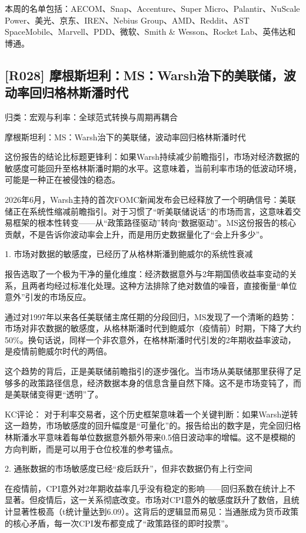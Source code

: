 \documentclass[11pt]{ctexart}
\begin{document}
本周的名单包括：AECOM、Snap、Accenture、Super Micro、Palantir、NuScale Power、美光、京东、IREN、Nebius Group、AMD、Reddit、AST SpaceMobile、Marvell、PDD、微软、Smith \& Wesson、Rocket Lab、英伟达和博通。

\subsection{[R028] 摩根斯坦利：MS：Warsh治下的美联储，波动率回归格林斯潘时代}
{\small\color{refgray}归类：宏观与利率：全球范式转换与周期再耦合}

摩根斯坦利：MS：Warsh治下的美联储，波动率回归格林斯潘时代

这份报告的结论比标题更锋利：如果Warsh持续减少前瞻指引，市场对经济数据的敏感度可能回升至格林斯潘时期的水平。这意味着，当前利率市场的低波动环境，可能是一种正在被侵蚀的稳态。

2026年6月，Warsh主持的首次FOMC新闻发布会已经释放了一个明确信号：美联储正在系统性缩减前瞻指引。对于习惯了“听美联储说话”的市场而言，这意味着交易框架的根本性转变——从“政策路径驱动”转向“数据驱动”。MS这份报告的核心贡献，不是告诉你波动率会上升，而是用历史数据量化了“会上升多少”。

1. 市场对数据的敏感度，已经历了从格林斯潘到鲍威尔的系统性衰减

报告选取了一个极为干净的量化维度：经济数据意外与2年期国债收益率变动的关系，且两者均经过标准化处理。这种方法排除了绝对数值的噪音，直接衡量“单位意外”引发的市场反应。

通过对1997年以来各任美联储主席任期的分段回归，MS发现了一个清晰的趋势：市场对非农数据的敏感度，从格林斯潘时代到鲍威尔（疫情前）时期，下降了大约50\%。换句话说，同样一个非农意外，在格林斯潘时代引发的2年期收益率波动，是疫情前鲍威尔时代的两倍。

这个趋势的背后，正是美联储前瞻指引的逐步强化。当市场从美联储那里获得了足够多的政策路径信息，经济数据本身的信息含量自然下降。这不是市场变钝了，而是美联储变得更“透明”了。

KC评论： 对于利率交易者，这个历史框架意味着一个关键判断：如果Warsh逆转这一趋势，市场敏感度的回升幅度是“可量化”的。报告给出的数字是，完全回归格林斯潘水平意味着每单位数据意外额外带来0.5倍日波动率的增幅。这不是模糊的方向判断，而是可以用于仓位校准的参考锚点。

2. 通胀数据的市场敏感度已经“疫后跃升”，但非农数据仍有上行空间

在疫情前，CPI意外对2年期收益率几乎没有稳定的影响——回归系数在统计上不显著。但疫情后，这一关系彻底改变。市场对CPI意外的敏感度跃升了数倍，且统计显著性极高（t统计量达到6.09）。这背后的逻辑显而易见：当通胀成为货币政策的核心矛盾，每一次CPI发布都变成了“政策路径的即时投票”。
\end{document}
